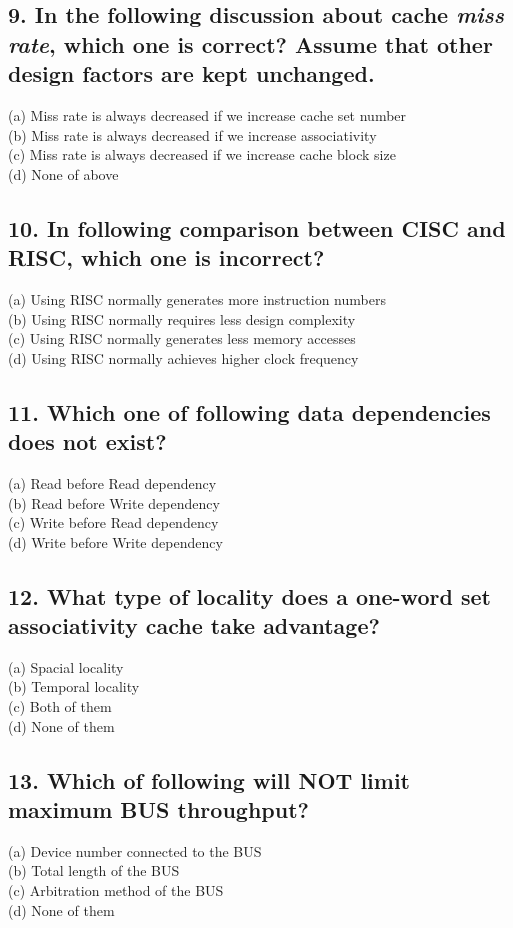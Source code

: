 \documentclass[UTF8]{ctexart}
\begin{document}
\subsection*{9. In the following discussion about cache {\bfseries\textit{miss rate}}, which one is correct? Assume that other design factors are kept unchanged.}
(a) Miss rate is always decreased if we increase cache set number\\
(b) Miss rate is always decreased if we increase associativity\\
(c) Miss rate is always decreased if we increase cache block size\\
(d) None of above\\

\subsection*{10. In following comparison between CISC and RISC, which one is incorrect?}
(a) Using RISC normally generates more instruction numbers\\
(b) Using RISC normally requires less design complexity\\
(c) Using RISC normally generates less memory accesses\\
(d) Using RISC normally achieves higher clock frequency\\

\subsection*{11. Which one of following data dependencies does not exist?}
(a) Read before Read dependency\\
(b) Read before Write dependency\\
(c) Write before Read dependency\\
(d) Write before Write dependency\\

\subsection*{12. What type of locality does a one-word set associativity cache take advantage?}
(a) Spacial locality\\
(b) Temporal locality\\
(c) Both of them\\
(d) None of them\\

\subsection*{13. Which of following will NOT limit maximum BUS throughput?}
(a) Device number connected to the BUS\\
(b) Total length of the BUS\\
(c) Arbitration method of the BUS\\
(d) None of them\\
\end{document}
